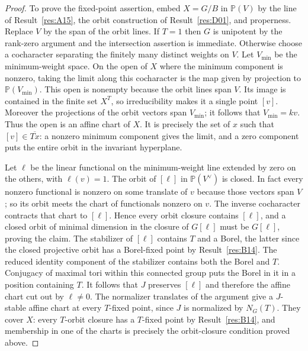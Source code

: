 \documentclass[11pt,a4paper,openany,oneside]{book}
\theoremstyle{resultstyle}
\theoremstyle{definition}
\numberwithin{equation}{chapter}
\begin{document}
\begin{proof}
To prove the fixed-point assertion, embed \(X=G/B\) in
\(\mathbb P(V)\) by the line of Result~\ref{res:A15},
the orbit construction of Result~\ref{res:D01}, and properness.
Replace \(V\) by the span of the orbit lines. If \(T=1\) then
\(G\) is unipotent by the rank-zero argument and the intersection
assertion is immediate. Otherwise choose a cocharacter separating
the finitely many distinct weights on \(V\). Let \(V_{\min}\)
be the minimum-weight space. On the open of \(X\) where the
minimum component is nonzero, taking the limit along this
cocharacter is the map given by projection to
\(\mathbb P(V_{\min})\). This open is nonempty because the orbit
lines span \(V\). Its image is contained in the finite set
\(X^T\), so irreducibility makes it a single point \([v]\).
Moreover the projections of the orbit vectors span \(V_{\min}\);
it follows that \(V_{\min}=kv\).
Thus the open is an affine chart of \(X\). It is precisely
the set of \(x\) such that \([v]\in\overline{T x}\):
a nonzero minimum component gives the limit, and a zero
component puts the entire orbit in the invariant hyperplane.

Let \(\ell\) be the linear functional on the minimum-weight
line extended by zero on the others, with \(\ell(v)=1\).
The orbit of \([\ell]\) in \(\mathbb P(V^\vee)\) is closed.
In fact every nonzero functional is nonzero on some translate
of \(v\) because those vectors span \(V\); so its orbit
meets the chart of functionals nonzero on \(v\).
The inverse cocharacter contracts that chart to \([\ell]\).
Hence every orbit closure contains \([\ell]\), and a closed
orbit of minimal dimension in the closure of \(G[\ell]\)
must be \(G[\ell]\), proving the claim. The stabilizer
of \([\ell]\) contains \(T\) and a Borel, the latter since
the closed projective orbit has a Borel-fixed point by
Result~\ref{res:B14}. The reduced identity component of the
stabilizer contains both the Borel and \(T\). Conjugacy of
maximal tori within this connected group puts the Borel in it
in a position containing \(T\). It follows that \(J\) preserves
\([\ell]\) and therefore the affine chart cut out by \(\ell\ne0\).
The normalizer translates of the argument give a \(J\)-stable
affine chart at every \(T\)-fixed point, since \(J\) is normalized
by \(N_G(T)\). They cover \(X\): every \(T\)-orbit closure has
a \(T\)-fixed point by Result~\ref{res:B14}, and membership in
one of the charts is precisely the orbit-closure condition
proved above.


\end{proof}
\end{document}
